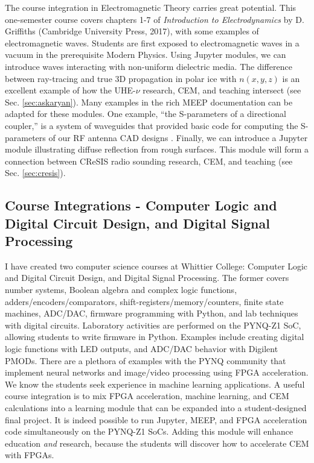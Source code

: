 \documentclass[10pt]{amsart}
\theoremstyle{definition}
\numberwithin{equation}{section}
\begin{document}
The course integration in Electromagnetic Theory carries great potential.  This one-semester course covers chapters 1-7 of \textit{Introduction to Electrodynamics} by D. Griffiths (Cambridge University Press, 2017), with some examples of electromagnetic waves.  Students are first exposed to electromagnetic waves in a vacuum in the prerequisite Modern Physics.  Using Jupyter modules, we can introduce waves interacting with non-uniform dielectric media.  The difference between ray-tracing and true 3D propagation in polar ice with $n(x,y,z)$ is an excellent example of how the UHE-$\nu$ research, CEM, and teaching intersect (see Sec. \ref{sec:askaryan}).  Many examples in the rich MEEP documentation can be adapted for these modules.  One example, ``the S-parameters of a directional coupler,'' is a system of waveguides that provided basic code for computing the S-parameters of our RF antenna CAD designs \cite{meepcon2022}.  Finally, we can introduce a Jupyter module illustrating diffuse reflection from rough surfaces.  This module will form a connection between CReSIS radio sounding research, CEM, and teaching (see Sec. \ref{sec:cresis}).  

\subsection{Course Integrations - Computer Logic and Digital Circuit Design, and Digital Signal Processing}

I have created two computer science courses at Whittier College: Computer Logic and Digital Circuit Design, and Digital Signal Processing.  The former covers number systems, Boolean algebra and complex logic functions, adders/encoders/comparators, shift-registers/memory/counters, finite state machines, ADC/DAC, firmware programming with Python, and lab techniques with digital circuits.  Laboratory activities are performed on the PYNQ-Z1 SoC, allowing students to write firmware in Python.  Examples include creating digital logic functions with LED outputs, and ADC/DAC behavior with Digilent PMODs.  There are a plethora of examples with the PYNQ community that implement neural networks and image/video processing using FPGA acceleration.  We know the students seek experience in machine learning applications.  A useful course integration is to mix FPGA acceleration, machine learning, and CEM calculations into a learning module that can be expanded into a student-designed final project.  It is indeed possible to run Jupyter, MEEP, and FPGA acceleration code simultaneously on the PYNQ-Z1 SoCs.  Adding this module will enhance education \textit{and} research, because the students will discover how to accelerate CEM with FPGAs.
\end{document}
